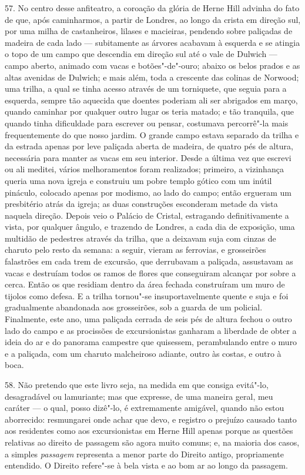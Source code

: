 57. No centro desse anfiteatro, a coroação da glória de Herne Hill
advinha do fato de que, após caminharmos, a partir de Londres, ao longo
da crista em direção sul, por uma milha de castanheiros, lilases e
macieiras, pendendo sobre paliçadas de madeira de cada lado ---
subitamente as árvores acabavam à esquerda e se atingia o topo de um
campo que descendia em direção sul até o vale de Dulwich --- campo
aberto, animado com vacas e botões"-de"-ouro; abaixo os belos prados e as
altas avenidas de Dulwich; e mais além, toda a crescente das colinas de
Norwood; uma trilha, a qual se tinha acesso através de um torniquete,
que seguia para a esquerda, sempre tão aquecida que doentes poderiam ali
ser abrigados em março, quando caminhar por qualquer outro lugar os
teria matado; e tão tranquila, que quando tinha dificuldade para
escrever ou pensar, costumava percorrê"-la mais frequentemente do que
nosso jardim. O grande campo estava separado da trilha e da estrada
apenas por leve paliçada aberta de madeira, de quatro pés de altura,
necessária para manter as vacas em seu interior. Desde a última vez que
escrevi ou ali meditei, vários melhoramentos foram realizados; primeiro,
a vizinhança queria uma nova igreja e construiu um pobre templo gótico
com um inútil pináculo, colocado apenas por modismo, ao lado do campo;
então ergueram um presbitério atrás da igreja; as duas construções
esconderam metade da vista naquela direção. Depois veio o Palácio de
Cristal, estragando definitivamente a vista, por qualquer ângulo, e
trazendo de Londres, a cada dia de exposição, uma multidão de pedestres
através da trilha, que a deixavam suja com cinzas de charuto pelo resto
da semana: a seguir, vieram as ferrovias, e grosseirões falastrões em
cada trem de excursão, que derrubavam a paliçada, assustavam as vacas e
destruíam todos os ramos de flores que conseguiram alcançar por sobre a
cerca. Então os que residiam dentro da área fechada construíram um muro
de tijolos como defesa. E a trilha tornou"-se insuportavelmente quente e
suja e foi gradualmente abandonada aos grosseirões, sob a guarda de um
policial. Finalmente, este ano, uma paliçada cerrada de seis pés de
altura fechou o outro lado do campo e as procissões de excursionistas
ganharam a liberdade de obter a ideia do ar e do panorama campestre que
quisessem, perambulando entre o muro e a paliçada, com um charuto
malcheiroso adiante, outro às costas, e outro à boca.

58. Não pretendo que este livro seja, na medida em que consiga evitá"-lo,
desagradável ou lamuriante; mas que expresse, de uma maneira geral, meu
caráter --- o qual, posso dizê"-lo, é extremamente amigável, quando não
estou aborrecido: resmungarei onde achar que devo, e registro o prejuízo
causado tanto aos residentes como aos excursionistas em Herne Hill
apenas porque as questões relativas ao direito de passagem são agora
muito comuns; e, na maioria dos casos, a simples \emph{passagem}
representa a menor parte do Direito antigo, propriamente entendido. O
Direito refere"-se à bela vista e ao bom ar ao longo da passagem.

